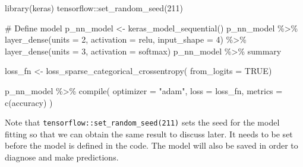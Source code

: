 \documentclass[
  letterpaper,
]{krantz}
\newenvironment{Shaded}{\begin{snugshade}}{\end{snugshade}}
\newcommand{\AttributeTok}[1]{\textcolor[rgb]{0.40,0.45,0.13}{#1}}
\newcommand{\CommentTok}[1]{\textcolor[rgb]{0.37,0.37,0.37}{#1}}
\newcommand{\ConstantTok}[1]{\textcolor[rgb]{0.56,0.35,0.01}{#1}}
\newcommand{\DecValTok}[1]{\textcolor[rgb]{0.68,0.00,0.00}{#1}}
\newcommand{\FunctionTok}[1]{\textcolor[rgb]{0.28,0.35,0.67}{#1}}
\newcommand{\NormalTok}[1]{\textcolor[rgb]{0.00,0.23,0.31}{#1}}
\newcommand{\OtherTok}[1]{\textcolor[rgb]{0.00,0.23,0.31}{#1}}
\newcommand{\SpecialCharTok}[1]{\textcolor[rgb]{0.37,0.37,0.37}{#1}}
\newcommand{\StringTok}[1]{\textcolor[rgb]{0.13,0.47,0.30}{#1}}
\begin{document}
\begin{Shaded}
\begin{Highlighting}[]
\FunctionTok{library}\NormalTok{(keras)}
\NormalTok{tensorflow}\SpecialCharTok{::}\FunctionTok{set\_random\_seed}\NormalTok{(}\DecValTok{211}\NormalTok{)}

\CommentTok{\# Define model}
\NormalTok{p\_nn\_model }\OtherTok{\textless{}{-}} \FunctionTok{keras\_model\_sequential}\NormalTok{()}
\NormalTok{p\_nn\_model }\SpecialCharTok{\%\textgreater{}\%} 
  \FunctionTok{layer\_dense}\NormalTok{(}\AttributeTok{units =} \DecValTok{2}\NormalTok{, }\AttributeTok{activation =} \StringTok{\textquotesingle{}relu\textquotesingle{}}\NormalTok{, }
              \AttributeTok{input\_shape =} \DecValTok{4}\NormalTok{) }\SpecialCharTok{\%\textgreater{}\%} 
  \FunctionTok{layer\_dense}\NormalTok{(}\AttributeTok{units =} \DecValTok{3}\NormalTok{, }\AttributeTok{activation =} \StringTok{\textquotesingle{}softmax\textquotesingle{}}\NormalTok{)}
\NormalTok{p\_nn\_model }\SpecialCharTok{\%\textgreater{}\%}\NormalTok{ summary}

\NormalTok{loss\_fn }\OtherTok{\textless{}{-}} \FunctionTok{loss\_sparse\_categorical\_crossentropy}\NormalTok{(}
  \AttributeTok{from\_logits =} \ConstantTok{TRUE}\NormalTok{)}

\NormalTok{p\_nn\_model }\SpecialCharTok{\%\textgreater{}\%} \FunctionTok{compile}\NormalTok{(}
  \AttributeTok{optimizer =} \StringTok{"adam"}\NormalTok{,}
  \AttributeTok{loss      =}\NormalTok{ loss\_fn,}
  \AttributeTok{metrics   =} \FunctionTok{c}\NormalTok{(}\StringTok{\textquotesingle{}accuracy\textquotesingle{}}\NormalTok{)}
\NormalTok{)}
\end{Highlighting}
\end{Shaded}

Note that \texttt{tensorflow::set\_random\_seed(211)} sets the seed for
the model fitting so that we can obtain the same result to discuss
later. It needs to be set before the model is defined in the code. The
model will also be saved in order to diagnose and make predictions.
\end{document}
